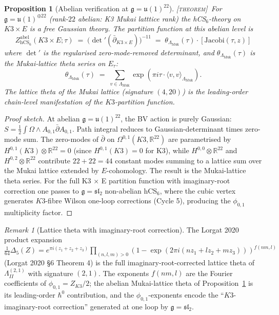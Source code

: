 \documentclass[11pt]{amsart}
\providecommand{\R}{\mathbb{R}}
\providecommand{\dbar}{\bar{\partial}}
\providecommand{\g}{\mathfrak{g}}
\providecommand{\fsl}{\mathfrak{sl}}
\providecommand{\fu}{\mathfrak{u}}
\providecommand{\hCS}{\mathrm{hCS}}
\providecommand{\Muk}{\Lambda_{\mathrm{Muk}}}
\providecommand{\HB}{\Lambda^{(2,1)}_{I\!I}}
\providecommand{\ClaimStatusTheorem}{\textsc{[theorem]}}
\theoremstyle{plain}
\newtheorem{proposition}[theorem]{Proposition}
\theoremstyle{definition}
\theoremstyle{remark}
\newtheorem{remark}[theorem]{Remark}
\begin{document}
\begin{proposition}[Abelian verification at $\g = \fu(1)^{22}$]
\label{prop:abelian-check}
\ClaimStatusTheorem\
For $\g = \fu(1)^{\oplus 22}$ (rank-$22$ abelian: K3 Mukai latttice
rank) the hCS$_{6}$-theory on $K3\times E$ is a free
Gaussian theory. The partition function at this abelian level is
\[
Z^{\mathrm{abel}}_{\hCS_{6}}(K3\times E; \tau) \;=\;
\bigl(\det{}'(\dbar_{K3\times E})\bigr)^{-11} \;=\; \theta_{\Muk}(\tau)
\cdot [\text{Jacobi}(\tau, z)]
\]
where $\det'$ is the regularised zero-mode-removed determinant, and
$\theta_{\Muk}(\tau)$ is the Mukai-lattice theta series on $E_{\tau}$:
\[
\theta_{\Muk}(\tau) \;=\; \sum_{v\in \Muk} \exp(\pi i\tau \cdot
\langle v, v\rangle_{\Muk}).
\]
The lattice theta of the Mukai lattice (signature $(4, 20)$) is the
leading-order chain-level manifestation of the $K3$-partition function.
\end{proposition}

\begin{proof}[Proof sketch]
At abelian $\g = \fu(1)^{22}$, the BV action is purely Gaussian:
$S = \tfrac12\int \Omega \wedge A_{0,1}\dbar A_{0,1}$. Path integral
reduces to Gaussian-determinant times zero-mode sum. The zero-modes of
$\dbar$ on $\Omega^{0,1}(K3,\R^{22})$ are parametrised by
$H^{0,1}(K3)\otimes \R^{22} = 0$ (since $H^{0,1}(K3)=0$ for K3), while
$H^{0,0}\otimes \R^{22}$ and $H^{0,2}\otimes \R^{22}$ contribute
$22+22 = 44$ constant modes summing to a lattice sum over the Mukai
lattice extended by $E$-cohomology. The result is the Mukai-lattice
theta series. For the full K3 $\times$ E partition function with
imaginary-root correction one passes to $\g = \fsl_{2}$ non-abelian
hCS$_{6}$, where the cubic vertex generates $K3$-fibre Wilson
one-loop corrections (Cycle 5), producing the $\phi_{0,1}$
multiplicity factor.
\end{proof}

\begin{remark}[Lattice theta with imaginary-root correction]
\label{rem:lattice-theta-correction}
The Lorgat 2020 product expansion
$\tfrac{1}{64}\Delta_{5}(Z) = e^{\pi i(z_{1}+z_{2}+z_{3})}\prod_{
(n,l,m)>0}(1-\exp(2\pi i(nz_{1}+lz_{2}+mz_{3})))^{f(nm,l)}$
(Lorgat 2020 \S6 Theorem 4) is the full imaginary-root-corrected
lattice theta of $\HB$ with signature $(2,1)$. The exponents $f(nm,l)$
are the Fourier coefficients of $\phi_{0,1}=Z_{K3}/2$; the abelian
Mukai-lattice theta of Proposition~\ref{prop:abelian-check} is its
leading-order $\hbar^{0}$ contribution, and the
$\phi_{0,1}$-exponents encode the ``$K3$-imaginary-root correction''
generated at one loop by $\g = \fsl_{2}$.
\end{remark}
\end{document}
